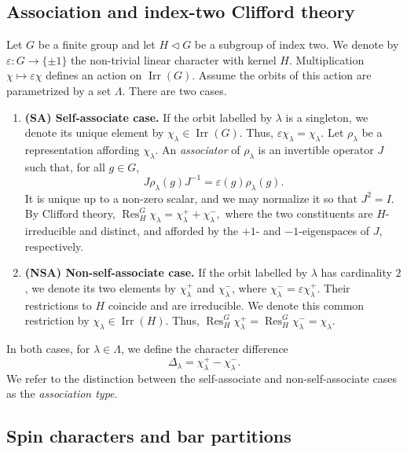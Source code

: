 \documentclass[reqno]{amsart}
\DeclareMathOperator{\Irr}{Irr}
\DeclareMathOperator{\Res}{Res}
\theoremstyle{definition}
\begin{document}
\subsection{Association and index-two Clifford theory}
\label{subsec:indice2}

Let $G$ be a finite group and let $H\triangleleft G$ be a subgroup of
index two. We denote by $\varepsilon:G\longrightarrow\{\pm1\}$
the non-trivial linear character with kernel $H$.
Multiplication $ \chi\longmapsto\varepsilon\chi$ defines an action on
$\Irr(G)$.
Assume the orbits of this action are parametrized by a set
$\Lambda$. There are two cases.
\begin{enumerate}[$\star$]
\item \textbf{(SA) Self-associate case.} If the orbit labelled by
$\lambda$ is a singleton, we denote its unique element by
$\chi_\lambda\in\Irr(G)$. Thus, $\varepsilon\chi_\lambda=\chi_\lambda$. 
Let \(\rho_\lambda\) be a representation affording \(\chi_\lambda\).
An \emph{associator} of \(\rho_\lambda\) is an invertible operator \(J\)
such that, for all $g\in G$,
\[
J\rho_\lambda(g)J^{-1}
=
\varepsilon(g)\rho_\lambda(g).
\]
It is unique up to a non-zero scalar, and we may normalize it so that $
J^2=I$.
By Clifford theory,
$
\Res_H^G\chi_\lambda
=
\chi_\lambda^++\chi_\lambda^-,
$
where the two constituents are $H$-irreducible and distinct, and afforded
by the \(+1\)- and \(-1\)-eigenspaces of \(J\), respectively.
\item \textbf{(NSA) Non-self-associate case.}
If the orbit labelled by $\lambda$ has cardinality $2$, we denote its two
elements by $ \chi_\lambda^+$ and $\chi_\lambda^- $, where $
\chi_\lambda^-=\varepsilon\chi_\lambda^+$.
Their restrictions to $H$ coincide and are irreducible. We denote this
common restriction by $
\chi_\lambda\in\Irr(H)$. Thus, $ \Res_H^G\chi_\lambda^+ =
\Res_H^G\chi_\lambda^- = \chi_\lambda$.
\end{enumerate}
In both cases, for $\lambda\in\Lambda$, we define the character difference
\begin{equation}
\label{eq:chardiff}
\Delta_\lambda=\chi_\lambda^+-\chi_\lambda^-.
\end{equation}
We refer to the distinction between the self-associate and
non-self-associate cases as the \emph{association type}.
\subsection{Spin characters and bar partitions}
\end{document}
